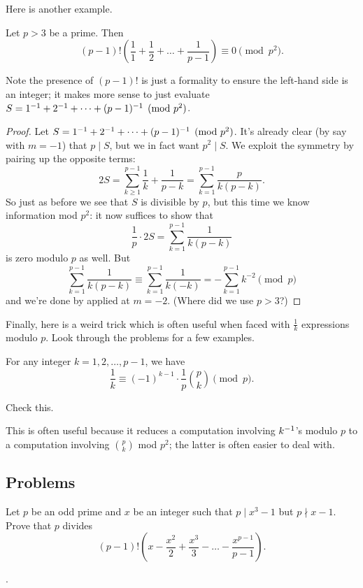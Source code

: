 \documentclass[11pt]{scrartcl}
\begin{document}
Here is another example.
\begin{example}
	Let $p > 3$ be a prime.
	Then
	\[ (p-1)!\left( \frac11 + \frac12 + \dots + \frac1{p-1} \right) \equiv 0 \pmod{p^2}. \]
\end{example}
Note the presence of $(p-1)!$ is just a formality to ensure
the left-hand side is an integer; it makes more sense
to just evaluate $S = 1^{-1} + 2^{-1} + \dots + (p-1)^{-1} \pmod{p^2}$.
\begin{proof}
	Let $S = 1^{-1} + 2^{-1} + \dots + (p-1)^{-1} \pmod{p^2}$.
	It's already clear (by say  with $m = -1$)
	that $p \mid S$, but we in fact want $p^2 \mid S$.
	We exploit the symmetry by pairing up the opposite terms:
	\[
		2S = \sum_{k \ge 1}^{p-1} \frac{1}{k} + \frac{1}{p-k}
		= \sum_{k=1}^{p-1} \frac{p}{k(p-k)}.
	\]
	So just as before we see that $S$ is divisible by $p$,
	but this time we know information mod $p^2$: it now suffices to show that
	\[ \frac{1}{p} \cdot 2S = \sum_{k=1}^{p-1} \frac{1}{k(p-k)} \]
	is zero modulo $p$ as well.
	But
	\[
		\sum_{k=1}^{p-1} \frac{1}{k(p-k)}
		\equiv \sum_{k=1}^{p-1} \frac{1}{k(-k)}
		= -\sum_{k=1}^{p-1} k^{-2}
		\pmod p
	\]
	and we're done by  applied at $m=-2$.
	(Where did we use $p > 3$?)
\end{proof}

Finally, here is a weird trick which is often useful when
faced with $\frac1k$ expressions modulo $p$.
Look through the problems for a few examples.
\begin{lemma}
	\label{lem:harmonic_p_trick}
	For any integer $k = 1, 2, \dots, p-1$, we have
	\[ \frac{1}{k} \equiv (-1)^{k-1} \cdot \frac1p \binom pk \pmod p. \]
\end{lemma}
\begin{exercise}
	Check this.
\end{exercise}

This is often useful because it reduces a computation
involving $k^{-1}$'s modulo $p$ to a computation
involving $\binom pk$ mod $p^2$;
the latter is often easier to deal with.

\subsection{Problems}
\begin{problem} %
	[ELMO 2009, John Berman]
	Let $p$ be an odd prime and $x$ be an integer
	such that $p \mid x^3 - 1$ but $p \nmid x - 1$.
	Prove that $p$ divides
	\[ (p-1)!
		\left( x - \frac{x^2}{2} + \frac{x^3}{3} - \dots - \frac{x^{p-1}}{p-1} \right).
	\]
	\begin{hint}
		.
	\end{hint}
\end{problem}
\end{document}
